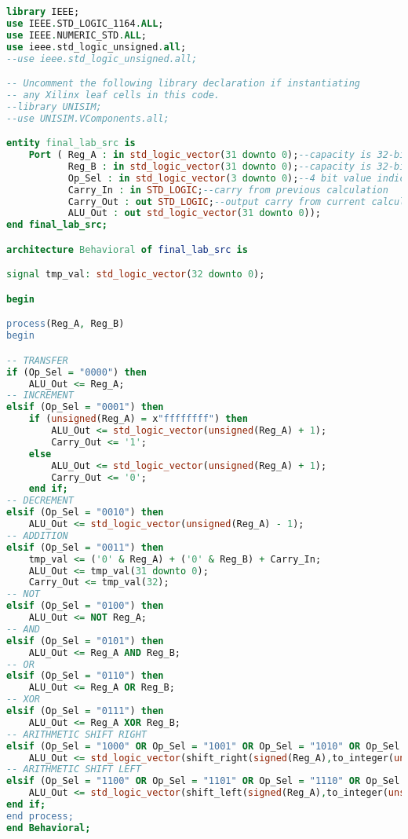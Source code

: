 \documentclass[notitlepage,a4paper,oneside,article,table]{article}
\begin{document}
\lstset{style=mystyle}
\begin{lstlisting}[language=VHDL, caption=IC source/behavior file code]
library IEEE;
use IEEE.STD_LOGIC_1164.ALL;
use IEEE.NUMERIC_STD.ALL;
use ieee.std_logic_unsigned.all;
--use ieee.std_logic_unsigned.all;

-- Uncomment the following library declaration if instantiating
-- any Xilinx leaf cells in this code.
--library UNISIM;
--use UNISIM.VComponents.all;

entity final_lab_src is
    Port ( Reg_A : in std_logic_vector(31 downto 0);--capacity is 32-bits
           Reg_B : in std_logic_vector(31 downto 0);--capacity is 32-bits
           Op_Sel : in std_logic_vector(3 downto 0);--4 bit value indicates the type of operation performed
           Carry_In : in STD_LOGIC;--carry from previous calculation
           Carry_Out : out STD_LOGIC;--output carry from current calculation.
           ALU_Out : out std_logic_vector(31 downto 0));
end final_lab_src;

architecture Behavioral of final_lab_src is

signal tmp_val: std_logic_vector(32 downto 0); 

begin

process(Reg_A, Reg_B)
begin

-- TRANSFER
if (Op_Sel = "0000") then
    ALU_Out <= Reg_A;
-- INCREMENT
elsif (Op_Sel = "0001") then
    if (unsigned(Reg_A) = x"ffffffff") then
        ALU_Out <= std_logic_vector(unsigned(Reg_A) + 1);
        Carry_Out <= '1';
    else
        ALU_Out <= std_logic_vector(unsigned(Reg_A) + 1);
        Carry_Out <= '0';
    end if;
-- DECREMENT
elsif (Op_Sel = "0010") then
    ALU_Out <= std_logic_vector(unsigned(Reg_A) - 1);
-- ADDITION
elsif (Op_Sel = "0011") then
    tmp_val <= ('0' & Reg_A) + ('0' & Reg_B) + Carry_In;
    ALU_Out <= tmp_val(31 downto 0);
    Carry_Out <= tmp_val(32);
-- NOT
elsif (Op_Sel = "0100") then
    ALU_Out <= NOT Reg_A;
-- AND
elsif (Op_Sel = "0101") then
    ALU_Out <= Reg_A AND Reg_B;
-- OR
elsif (Op_Sel = "0110") then
    ALU_Out <= Reg_A OR Reg_B;
-- XOR
elsif (Op_Sel = "0111") then
    ALU_Out <= Reg_A XOR Reg_B;
-- ARITHMETIC SHIFT RIGHT
elsif (Op_Sel = "1000" OR Op_Sel = "1001" OR Op_Sel = "1010" OR Op_Sel = "1011") then
    ALU_Out <= std_logic_vector(shift_right(signed(Reg_A),to_integer(unsigned(Reg_B))));
-- ARITHMETIC SHIFT LEFT
elsif (Op_Sel = "1100" OR Op_Sel = "1101" OR Op_Sel = "1110" OR Op_Sel = "1111") then
    ALU_Out <= std_logic_vector(shift_left(signed(Reg_A),to_integer(unsigned(Reg_B))));
end if;    
end process;
end Behavioral;
\end{lstlisting}
\end{document}
